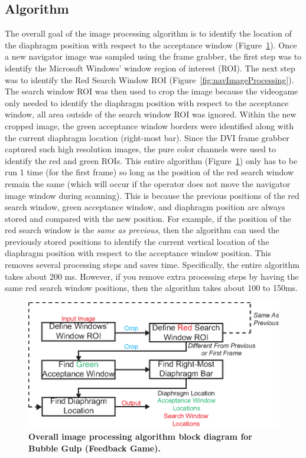 \subsection{Algorithm}
	The overall goal of the image processing algorithm is to identify the location of the diaphragm position with respect to the acceptance window (Figure~\ref{fig:algorithmblockdiagram}). Once a new navigator image was sampled using the frame grabber, the first step was to identify the Microsoft Windows' window region of interest (ROI). The next step was to identify the Red Search Window ROI (Figure~\ref{fig:navImageProcessing}). The search window ROI was then used to crop the image because the videogame only needed to identify the diaphragm position with respect to the acceptance window, all area outside of the search window ROI was ignored. Within the new cropped image, the green acceptance window borders were identified along with the current diaphragm location (right-most bar). Since the DVI frame grabber captured such high resolution images, the pure color channels were used to identify the red and green ROIs. This entire algorithm (Figure~\ref{fig:algorithmblockdiagram}) only has to be run 1 time (for the first frame) so long as the position of the red search window remain the same (which will occur if the operator does not move the navigator image window during scanning). This is because the previous positions of the red search window, green acceptance window, and diaphragm position are always stored and compared with the new position. For example, if the position of the red search window is the \textit{same as previous}, then the algorithm can used the previously stored positions to identify the current vertical location of the diaphragm position with respect to the acceptance window position. This removes several processing steps and saves time. Specifically, the entire algorithm takes about 200 ms. However, if you remove extra processing steps by having the same red search window positions, then the algorithm takes about 100 to 150ms.
	
	\begin{figure}
		\centering
		\includegraphics{figures/gamepaper/09-algorithmDiagram}
		\caption[Overall image processing algorithm block diagram for Bubble Gulp (Feedback Game)]{\textbf{Overall image processing algorithm block diagram for Bubble Gulp (Feedback Game).}}
		\label{fig:algorithmblockdiagram}
	\end{figure}

